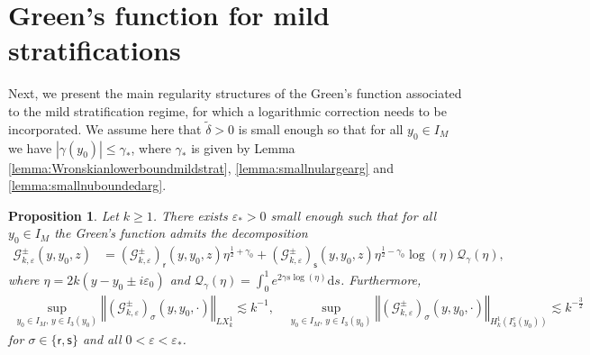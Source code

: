 \documentclass[11pt,reqno]{amsproc}
\newtheorem{proposition}{Proposition}[section]
\theoremstyle{definition}
\numberwithin{equation}{section}
\newcommand{\G}{{\mathcal{G}}}
\newcommand{\Q}{{\mathcal{Q}}}
\newcommand{\sr}{{\mathsf{r}}}
\newcommand{\s}{{\mathsf{s}}}
\renewcommand{\d}{\mathrm{d}}
\newcommand{\ep}{\varepsilon}
\begin{document}
\section{Green's function for mild stratifications}\label{sec:GreensM}
Next, we present the main regularity structures of the Green's function associated to the mild stratification regime, for which a logarithmic correction needs to be incorporated. We assume here that $\tilde\delta >0$ is small enough so that for all $y_0\in I_M$ we have $|\gamma(y_0)| \leq \gamma_*$, where $\gamma_*$ is given by Lemma \ref{lemma:Wronskianlowerboundmildstrat},  \ref{lemma:smallnulargearg} and \ref{lemma:smallnuboundedarg}.

\begin{proposition}\label{prop:logsobolevregdecomG}
Let $k\geq 1$. There exists $\ep_*>0$ small enough such that for all $y_0\in I_M$  the Green's function admits the decomposition
\begin{align*}
\G_{k,\ep}^\pm(y,y_0,z) &= \left( \G_{k,\ep}^\pm\right)_\sr(y,y_0,z) \eta^{\frac12 + \gamma_0} + \left( \G_{k,\ep}^\pm\right)_\s(y,y_0,z) \eta^{\frac12 -\gamma_0}\log(\eta) \mathcal{Q}_\gamma(\eta),
\end{align*}
where $\eta=2k(y-y_0\pm i\ep_0)$ and $\Q_{\gamma}(\eta) = \int_0^1 e^{2\gamma s \log(\eta)} \d s$. Furthermore,
\begin{align*}
\sup_{y_0\in I_M, \, y\in I_3(y_0)} \left\Vert \left( \G_{k,\ep}^\pm\right)_\sigma(y,y_0,\cdot) \right\Vert_{LX_k^1} \lesssim k^{-1}, \quad \sup_{y_0\in I_M, \, y\in I_3(y_0)} \left\Vert \left( \G_{k,\ep}^\pm\right)_\sigma(y,y_0,\cdot) \right\Vert_{H_k^1(I_3^c(y_0))} \lesssim k^{-\frac32}
\end{align*}
for $\sigma\in \lbrace \sr, \s \rbrace$ and all $0<\ep< \ep_*$.
\end{proposition}
\end{document}
